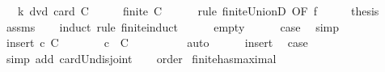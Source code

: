 \begin{isabellebody}
\ \ \ {\isachardoublequoteopen}k\ dvd\ card\ {\isacharparenleft}{\kern0pt}{\isasymUnion}C{\isacharparenright}{\kern0pt}{\isachardoublequoteclose}\isanewline
%
\isadelimproof
%
\endisadelimproof
%
\isatagproof
{}\isamarkupfalse%
\ {\isacharminus}{\kern0pt}\isanewline
\ \ \isamarkupfalse%
\ {\isachardoublequoteopen}finite\ C{\isachardoublequoteclose}\isanewline
\ \ \ \ \isamarkupfalse%
\ {\isacharparenleft}{\kern0pt}rule\ finite{\isacharunderscore}{\kern0pt}UnionD\ {\isacharbrackleft}{\kern0pt}OF\ f{\isacharbrackright}{\kern0pt}{\isacharparenright}{\kern0pt}\isanewline
\ \ \isamarkupfalse%
\ \isamarkupfalse%
\ {\isacharquery}{\kern0pt}thesis\isanewline
\ \ \ \ \isamarkupfalse%
\ assms\isanewline
\ \ \isamarkupfalse%
\ {\isacharparenleft}{\kern0pt}induct\ rule{\isacharcolon}{\kern0pt}\ finite{\isacharunderscore}{\kern0pt}induct{\isacharparenright}{\kern0pt}\isanewline
\ \ \ \ \isamarkupfalse%
\ empty\isanewline
\ \ \ \ \isamarkupfalse%
\ {\isacharquery}{\kern0pt}case\ \isamarkupfalse%
\ simp\isanewline
\ \ \isamarkupfalse%
\isanewline
\ \ \ \ \isamarkupfalse%
\ {\isacharparenleft}{\kern0pt}insert\ c\ C{\isacharparenright}{\kern0pt}\isanewline
\ \ \ \ \isamarkupfalse%
\ \isamarkupfalse%
\ {\isachardoublequoteopen}c\ {\isasyminter}\ {\isasymUnion}C\ {\isacharequal}{\kern0pt}\ {\isacharbraceleft}{\kern0pt}{\isacharbraceright}{\kern0pt}{\isachardoublequoteclose}\isanewline
\ \ \ \ \ \ \isamarkupfalse%
\ auto\isanewline
\ \ \ \ \isamarkupfalse%
\ insert\ \isamarkupfalse%
\ {\isacharquery}{\kern0pt}case\isanewline
\ \ \ \ \ \ \isamarkupfalse%
\ {\isacharparenleft}{\kern0pt}simp\ add{\isacharcolon}{\kern0pt}\ card{\isacharunderscore}{\kern0pt}Un{\isacharunderscore}{\kern0pt}disjoint{\isacharparenright}{\kern0pt}\isanewline
\ \ \isamarkupfalse%
\isanewline
{}\isamarkupfalse%
%
\endisatagproof
{\isafoldproof}%
%
\isadelimproof
%
\endisadelimproof
%
\isadelimdocument
%
\endisadelimdocument
%
\isatagdocument
%
\isamarkuptrue%
%
\endisatagdocument
{\isafolddocument}%
%
\isadelimdocument
%
\endisadelimdocument
{}\isamarkupfalse%
\ order\isanewline
{}\isanewline
\isanewline
{}\isamarkupfalse%
\ finite{\isacharunderscore}{\kern0pt}has{\isacharunderscore}{\kern0pt}maximal{\isacharcolon}{\kern0pt}\isanewline

\end{isabellebody}
